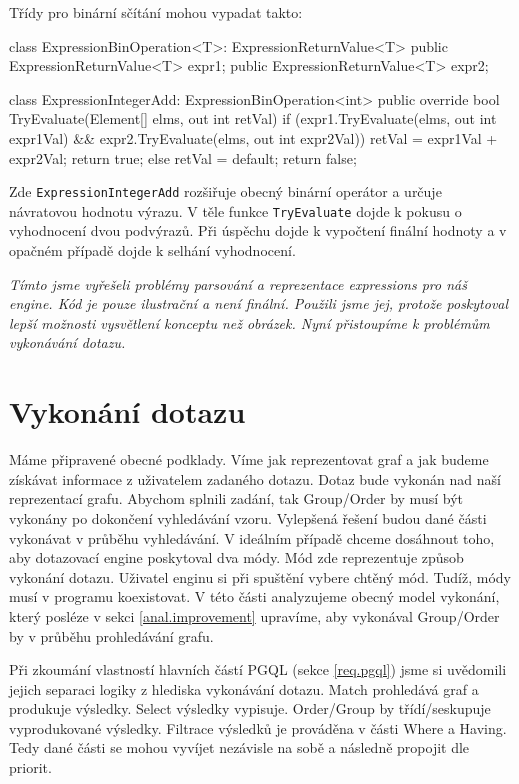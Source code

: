 Třídy pro binární sčítání mohou vypadat takto:
\begin{code}
class ExpressionBinOperation<T>: ExpressionReturnValue<T> {
  public ExpressionReturnValue<T> expr1;
  public ExpressionReturnValue<T> expr2;
}
\end{code}
\begin{code}
class ExpressionIntegerAdd: ExpressionBinOperation<int>{
  public override bool TryEvaluate(Element[] elms, out int retVal) {
    if (expr1.TryEvaluate(elms, out int expr1Val) &&
        expr2.TryEvaluate(elms, out int expr2Val)) {
      retVal = expr1Val + expr2Val;
      return true;
    } else {
      retVal = default;
      return false;
    }
  }
}
\end{code}
Zde \texttt{ExpressionIntegerAdd} rozšiřuje obecný binární operátor a určuje návratovou hodnotu výrazu.
V těle funkce \texttt{TryEvaluate} dojde k pokusu o vyhodnocení dvou podvýrazů.
Při úspěchu dojde k vypočtení finální hodnoty a v opačném případě dojde k selhání vyhodnocení. 

\bigskip
\textit{Tímto jsme vyřešeli problémy parsování a reprezentace expressions pro náš engine.
Kód je pouze ilustrační a není finální.
Použili jsme jej, protože poskytoval lepší možnosti vysvětlení konceptu než obrázek.
Nyní přistoupíme k problémům vykonávání dotazu.}

\clearpage

\section{Vykonání dotazu} \label{anal.vykonanidotazu}

Máme připravené obecné podklady.
Víme jak reprezentovat graf a jak budeme získávat informace z uživatelem zadaného dotazu.
Dotaz bude vykonán nad naší reprezentací grafu.
Abychom splnili zadání, tak Group/Order by musí být vykonány po dokončení vyhledávání vzoru.
Vylepšená řešení budou dané části vykonávat v průběhu vyhledávání.
V ideálním případě chceme dosáhnout toho, aby dotazovací engine poskytoval dva módy.
Mód zde reprezentuje způsob vykonání dotazu.
Uživatel enginu si při spuštění vybere chtěný mód.
Tudíž, módy musí v programu koexistovat.
V této části analyzujeme obecný model vykonání, který posléze v sekci \ref{anal.improvement} upravíme, aby vykonával Group/Order by v průběhu prohledávání grafu.

Při zkoumání vlastností hlavních částí PGQL (sekce \ref{req.pgql}) jsme si uvědomili jejich separaci logiky z hlediska vykonávání dotazu.
Match prohledává graf a produkuje výsledky. 
Select výsledky vypisuje. 
Order/Group by třídí/seskupuje vyprodukované výsledky.
Filtrace výsledků je prováděna v části Where a Having.
Tedy dané části se mohou vyvíjet nezávisle na sobě a následně propojit dle priorit.

